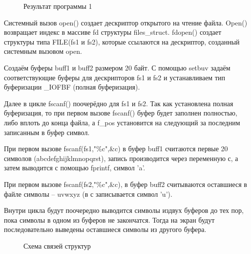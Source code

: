 \documentclass[14pt, a4paper]{extarticle}
\begin{document}
\begin{figure}[h!]
	\caption{Результат  программы 1}
\end{figure}\par

Системный вызов open() создает дескриптор открытого на чтение файла. Open() возвращает индекс в массиве fd структуры files\_struct. fdopen() создает структуры типа FILE(fs1 и fs2), которые ссылаются на дескриптор, созданный системным вызовом open.

Создаём буферы buff1 и buff2 размером 20 байт. С помощью setbuv задаём соответствующие буферы для дескрипторов fs1 и fs2 и устанавливаем тип буферизации \_IOFBF (полная буферизация).

Далее в цикле fscanf() поочерёдно для fs1 и fs2. Так как установлена полная буферизация, то при первом вызове fscanf() буфер будет заполнен полностью, либо вплоть до конца файла, а f\_pos установится на следующий за последним записанным в буфер символ.

При первом вызове fscanf(fs1,"\%c",\&c) в буфер buff1 считаются первые 20 символов (abcdefghijklmnopqrst), запись производится через переменную с, а затем выводится с помощью fprintf, символ 'a'.

При первом вызове fscanf(fs2,"\%c",\&c), в буфер buff2 считываются оставшиеся в файле символы – uvwxyz (в с записывается символ 'u').

Внутри цикла будут поочередно выводится символы издвух буферов до тех пор, пока символы в одном из буферов не закончатся. Тогда на экран будут последовательно выведены оставшиеся символы из другого буфера.

\begin{figure}[h!]
	\caption{Схема связей структур}
\end{figure}\par
\end{document}
